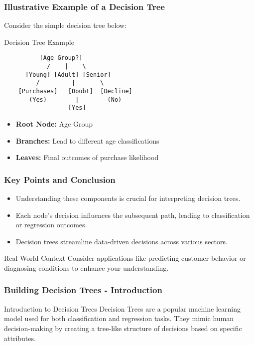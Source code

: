 \documentclass[aspectratio=169]{beamer}
\begin{document}
\begin{frame}[fragile]
  \frametitle{Illustrative Example of a Decision Tree}
  Consider the simple decision tree below:

  \begin{block}{Decision Tree Example}
      \begin{verbatim}
          [Age Group?]
            /    |    \
      [Young] [Adult] [Senior]
         /         |       \
    [Purchases]   [Doubt]  [Decline]
       (Yes)        |        (No)
                  [Yes]
      \end{verbatim}
  \end{block}

  \begin{itemize}
    \item \textbf{Root Node:} Age Group
    \item \textbf{Branches:} Lead to different age classifications
    \item \textbf{Leaves:} Final outcomes of purchase likelihood
  \end{itemize}
\end{frame}

\begin{frame}[fragile]
  \frametitle{Key Points and Conclusion}
  
  \begin{itemize}
    \item Understanding these components is crucial for interpreting decision trees.
    \item Each node's decision influences the subsequent path, leading to classification or regression outcomes.
    \item Decision trees streamline data-driven decisions across various sectors.
  \end{itemize}

  \begin{block}{Real-World Context}
    Consider applications like predicting customer behavior or diagnosing conditions to enhance your understanding.
  \end{block}
\end{frame}

\begin{frame}[fragile]
    \frametitle{Building Decision Trees - Introduction}
    \begin{block}{Introduction to Decision Trees}
        Decision Trees are a popular machine learning model used for both classification and regression tasks. They mimic human decision-making by creating a tree-like structure of decisions based on specific attributes.
    \end{block}
\end{frame}
\end{document}
